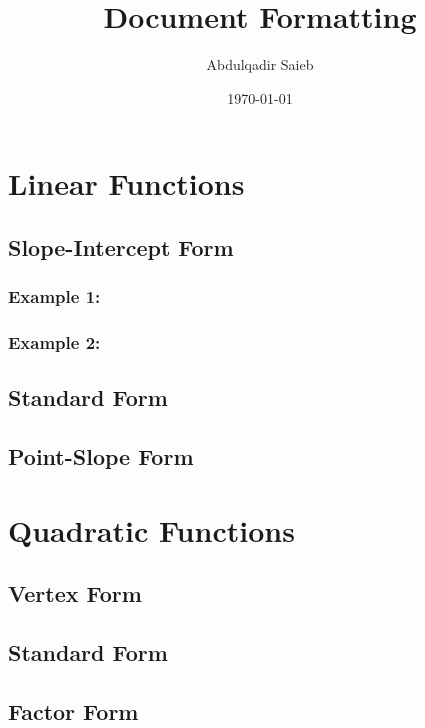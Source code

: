 \documentclass[11pt]{article}
\title{Document Formatting}
\author{Abdulqadir Saieb}
\date{\today}
\begin{document}
\tableofcontents
\maketitle

\section{Linear Functions}
	\subsection{Slope-Intercept Form}
		\subsubsection{Example 1:}
		\subsubsection{Example 2:}
	\subsection{Standard Form}
	\subsection{Point-Slope Form}
\section{Quadratic Functions}
	\subsection{Vertex Form}
	\subsection{Standard Form}
	\subsection{Factor Form}
	
	
	
	
\end{document}
